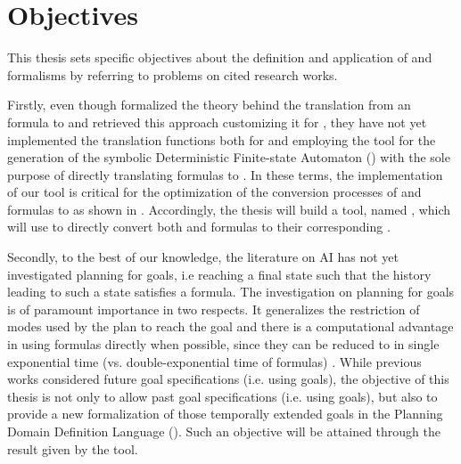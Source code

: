 \section{Objectives}
This thesis sets specific objectives about the definition and application of \LTLf and \PLTL formalisms by referring to problems on cited research works.

Firstly, even though \cite{de2013linear} formalized the theory behind the translation from an \LTLf formula to \FOL and \cite{zpv2018} retrieved this approach customizing it for \MONA, they have not yet implemented the translation functions both for \LTLf and \PLTL employing the \MONA tool for the generation of the symbolic Deterministic Finite-state Automaton (\DFA) with the sole purpose of directly translating formulas to \DFA. In these terms, the implementation of our tool is critical for the optimization of the conversion processes of \LTLf and \PLTL formulas to \DFA as shown in \cite{zhu2017symbolic}. Accordingly, the thesis will build a tool, named \LTLfToDFA, which will use \MONA to directly convert both \LTLf and \PLTL formulas to their corresponding \DFA.

Secondly, to the best of our knowledge, the literature on AI has not yet investigated planning for \PLTL goals, i.e reaching a final state such that the history leading to such a state satisfies a \PLTL formula. The investigation on planning for \PLTL goals is of paramount importance in two respects. It generalizes the restriction of modes used by the plan to reach the goal and there is a computational advantage in using \PLTL formulas directly when possible, since they can be reduced to \DFA in single exponential time (vs. double-exponential time of \LTLf formulas) \citep{chandra1981acm}. While previous works \citep{camacho2017non, camacho2018finite, camacho2018ltl} considered future goal specifications (i.e. using \LTLf goals), the objective of this thesis is not only to allow past goal specifications (i.e. using \PLTL goals), but also to provide a new formalization of those temporally extended goals in the Planning Domain Definition Language (\PDDL). Such an objective will be attained through the result given by the \LTLfToDFA tool.

